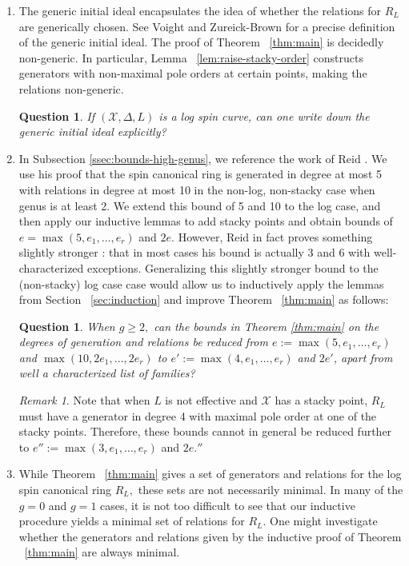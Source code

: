 \documentclass{amsart}
\theoremstyle{plain}
\newtheorem{question}[thm]{Question}
\theoremstyle{definition}
\theoremstyle{remark}
\newtheorem{rem}[thm]{Remark}
\numberwithin{equation}{section}
\newcommand\sx{\mathscr X}
\newcommand{\halfcan}{L}
\begin{document}
\begin{enumerate}
	\item The generic initial ideal
		encapsulates the idea of whether the relations for $R_\halfcan$ are 
		generically chosen. See Voight and Zureick-Brown \cite[Definition 2.2.7]{vzb:stacky} for a precise definition of the generic initial ideal.
		The proof of Theorem
		~\ref{thm:main} is decidedly non-generic. 
		In particular, Lemma ~\ref{lem:raise-stacky-order} 
		constructs generators with non-maximal pole orders at certain 
		points, making the relations non-generic. 
		\begin{question}
		\label{ques:generic-initial}
			If $(\sx, \Delta, \halfcan)$ is a log spin curve, can one write down the
			generic initial ideal explicitly?
		\end{question}
		
	\item In Subsection \ref{ssec:bounds-high-genus}, we reference 
		the work of Reid \cite[Theorem 3.4]{reid:infinitesimal}. We use his 
		proof that the 
		spin canonical ring is generated in degree at most 5 with
		relations in degree at most 10 in the 			
		non-log, non-stacky case when genus is at least 2. We extend this 
		bound of 5 and 10 to the log case, and then apply our inductive 
		lemmas to add stacky points and obtain bounds of $e = \max(5,e_1, \ldots, e_r)$ and $2e$.  However, Reid in fact proves something slightly stronger \cite[Theorem 3.4]{reid:infinitesimal}: that in 
		most cases his bound is actually 3 and 6 with well-characterized 
		exceptions.
		Generalizing this slightly stronger bound to the (non-stacky) log case case would allow us to inductively apply the lemmas from Section ~\ref{sec:induction} and improve Theorem ~\ref{thm:main} as follows:
		\begin{question}\label{ques:reduce-5,10-to-4,8}
			When $g \geq 2,$ can the bounds in Theorem \ref{thm:main} on 
			the degrees of generation and relations be reduced from 
			$e := \max(5, e_1, \ldots, e_r)$ and $\max(10, 2e_1, \ldots, 2e_r)$ to 
			$e' := \max(4, e_1, \ldots, e_r)$ and $2e'$, 
			apart from well a characterized list of families?
		\end{question}
		\begin{rem}\label{rem:reduce-3,6}
			Note that when $L$ is not effective and $\sx$ has a stacky point, $R_\halfcan$ must have a generator in degree 4 with maximal pole order at one of the stacky points.  Therefore, these bounds cannot in general be reduced further to 
			$e'' := \max(3, e_1, \ldots, e_r)$ and $2e.''$
			\end{rem}
	\item While Theorem ~\ref{thm:main} gives a set of 
		generators and relations
		for the log spin canonical ring $R_\halfcan,$ these sets are not necessarily minimal.
		In many of the $g = 0$ and $g = 1$ cases, 
		it is not too difficult to see that our inductive procedure
		yields a minimal set of relations for $R_\halfcan$. One might investigate 
		whether the generators and relations given by the inductive proof 
		of Theorem ~\ref{thm:main} are always minimal.
		\end{enumerate}
\end{document}
